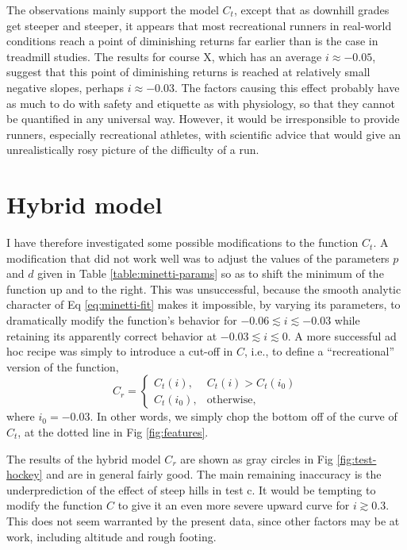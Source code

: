 \documentclass[10pt,letterpaper]{article}
\begin{document}
The observations mainly support the model $C_t$, except that as
downhill grades get steeper and steeper, it appears that most
recreational runners in real-world conditions reach a point of
diminishing returns far earlier than is the case in treadmill studies.
The results for course X, which has an average $i\approx -0.05$,
suggest that this point of diminishing returns is reached at relatively
small negative slopes, perhaps $i\approx -0.03$.
The factors causing this effect probably have as much to do with safety and etiquette as
with physiology, so that they cannot be quantified in any
universal way. However, it would be irresponsible to provide runners,
especially recreational athletes, with scientific advice that would
give an unrealistically rosy picture of the difficulty of a run.

\section{Hybrid model}\label{sec:hybrid}

I have therefore investigated some possible modifications to the function
$C_t$. A modification that did not work well was to adjust the values of the parameters $p$ and $d$
given in Table \ref{table:minetti-params} so as to shift the minimum of
the function up and to the right. This was unsuccessful, because the smooth
analytic character of Eq \eqref{eq:minetti-fit} makes it impossible, by varying its parameters, to 
dramatically modify the function's behavior for $-0.06\lesssim i \lesssim -0.03$
while retaining its apparently correct behavior at $-0.03 \lesssim i \lesssim 0$.
A more successful ad hoc recipe was simply to introduce a cut-off in $C$, i.e.,
to define a ``recreational'' version of the function,
\begin{equation}\label{eq:rec}
  C_r =   \begin{cases}
     C_t(i), & C_t(i)>C_t(i_0) \\
     C_t(i_0), & \text{otherwise},
  \end{cases}
\end{equation}
where $i_0=-0.03$.
In other words, we simply chop the bottom off of the curve of $C_t$, at the dotted
line in Fig \ref{fig:features}.

The results of the hybrid model $C_r$ are shown as gray circles in Fig \ref{fig:test-hockey}
and are in general fairly good. The main remaining inaccuracy is the underprediction of the
effect of steep hills in test c. It would be tempting to modify the function $C$ to give it
an even more severe upward curve for $i\gtrsim 0.3$. This does not seem warranted by the present
data, since other factors may be at work, including altitude and rough footing.
\end{document}
